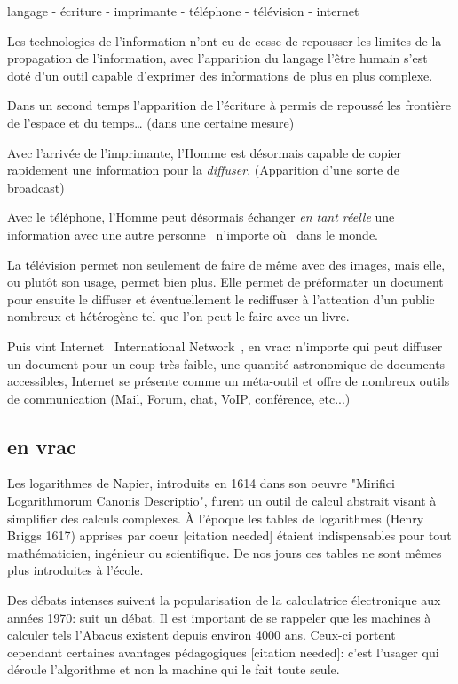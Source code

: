 langage - écriture - imprimante - téléphone - télévision - internet


Les technologies de l'information n'ont eu de cesse de repousser les limites de
la propagation de l'information, avec l'apparition du langage l'être humain
s'est doté d'un outil capable d'exprimer des informations de plus en plus
complexe. 

Dans un second temps l'apparition de l'écriture à permis de repoussé les
frontière de l'espace et du temps… (dans une certaine mesure)

Avec l'arrivée de l'imprimante, l'Homme est désormais capable de copier
rapidement une information pour la \emph{diffuser}. (Apparition d'une sorte
de broadcast)

Avec le téléphone, l'Homme peut désormais échanger \emph{en tant réelle} une 
information avec une autre personne \og{}~n'importe où~\fg{} dans le monde.

La télévision permet non seulement de faire de même avec des images, mais elle,
ou plutôt son usage, permet bien plus. Elle permet de préformater un document pour ensuite le
diffuser et éventuellement le rediffuser à l'attention d'un public nombreux et
hétérogène tel que l'on peut le faire avec un livre.

Puis vint Internet \og{}~International Network~\fg{}, en vrac: n'importe qui
peut diffuser un document pour un coup très faible, une quantité astronomique
de documents accessibles, Internet se présente comme un méta-outil et offre de
nombreux outils de communication (Mail, Forum, chat, VoIP, conférence, etc...)

\subsection{en vrac}

Les logarithmes de Napier, introduits en 1614 dans son oeuvre
"Mirifici Logarithmorum Canonis Descriptio", furent un outil de calcul
abstrait visant à simplifier des calculs complexes. À l'époque les
tables de logarithmes (Henry Briggs 1617) apprises par coeur [citation
  needed] étaient indispensables pour tout mathématicien, ingénieur ou
scientifique. De nos jours ces tables ne sont mêmes plus introduites à
l'école.

Des débats intenses suivent la popularisation de la calculatrice électronique 
aux années 1970: suit un débat. Il est important de se rappeler que les 
machines à calculer tels l'Abacus existent depuis environ 4000 ans. Ceux-ci 
portent cependant certaines avantages pédagogiques [citation needed]: c'est 
l'usager qui déroule l'algorithme et non la machine qui le fait toute seule. 

